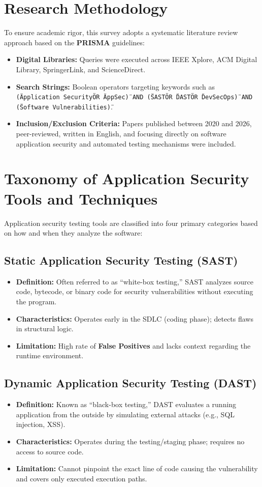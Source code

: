 \documentclass[11pt,a4paper]{article}
\begin{document}
\section{Research Methodology}
To ensure academic rigor, this survey adopts a systematic literature review approach based on the \textbf{PRISMA} guidelines:
\begin{itemize}
    \item \textbf{Digital Libraries:} Queries were executed across IEEE Xplore, ACM Digital Library, SpringerLink, and ScienceDirect.
    \item \textbf{Search Strings:} Boolean operators targeting keywords such as \texttt{(\"Application Security\" OR \"AppSec\") AND (\"SAST\" OR \"DAST\" OR \"DevSecOps\") AND (\"Software Vulnerabilities\")}.
    \item \textbf{Inclusion/Exclusion Criteria:} Papers published between 2020 and 2026, peer-reviewed, written in English, and focusing directly on software application security and automated testing mechanisms were included.
\end{itemize}

\section{Taxonomy of Application Security Tools and Techniques}
Application security testing tools are classified into four primary categories based on how and when they analyze the software:

\subsection{Static Application Security Testing (SAST)}
\begin{itemize}
    \item \textbf{Definition:} Often referred to as ``white-box testing,'' SAST analyzes source code, bytecode, or binary code for security vulnerabilities without executing the program.
    \item \textbf{Characteristics:} Operates early in the SDLC (coding phase); detects flaws in structural logic.
    \item \textbf{Limitation:} High rate of \textbf{False Positives} and lacks context regarding the runtime environment.
\end{itemize}

\subsection{Dynamic Application Security Testing (DAST)}
\begin{itemize}
    \item \textbf{Definition:} Known as ``black-box testing,'' DAST evaluates a running application from the outside by simulating external attacks (e.g., SQL injection, XSS).
    \item \textbf{Characteristics:} Operates during the testing/staging phase; requires no access to source code.
    \item \textbf{Limitation:} Cannot pinpoint the exact line of code causing the vulnerability and covers only executed execution paths.
\end{itemize}
\end{document}
